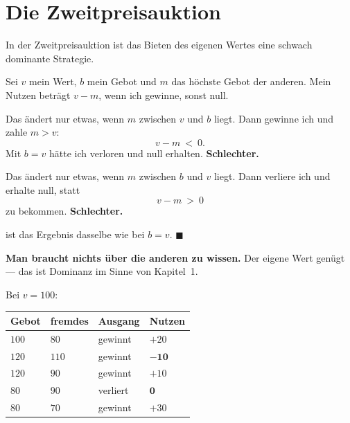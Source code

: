 \section{Die Zweitpreisauktion}

\begin{merksatz}
In der Zweitpreisauktion ist das Bieten des eigenen Wertes eine schwach dominante Strategie.

Sei $v$ mein Wert, $b$ mein Gebot und $m$ das höchste Gebot der anderen. Mein Nutzen beträgt $v-m$, wenn ich gewinne, sonst null.

 Das ändert nur etwas, wenn $m$ zwischen $v$ und $b$ liegt. Dann gewinne ich und zahle $m > v$:
\[ v - m \ <\ 0 . \]
Mit $b=v$ hätte ich verloren und null erhalten. \textbf{Schlechter.}

 Das ändert nur etwas, wenn $m$ zwischen $b$ und $v$ liegt. Dann verliere ich und erhalte null, statt
\[ v - m \ >\ 0 \]
zu bekommen. \textbf{Schlechter.}

 ist das Ergebnis dasselbe wie bei $b=v$. $\blacksquare$

\begin{center}
\begin{minipage}{0.9\textwidth}
\textbf{Man braucht nichts über die anderen zu wissen.} Der eigene Wert genügt --- das ist Dominanz im Sinne von Kapitel~1.
\end{minipage}
\end{center}

Bei $v = 100$:
\begin{center}
{\small
\renewcommand{\arraystretch}{1.48}
\begin{tabular}{@{}P{1.6cm}P{1.8cm}P{2.0cm}P{2.0cm}@{}}
\toprule
\textbf{Gebot} & \textbf{fremdes} & \textbf{Ausgang} & \textbf{Nutzen}\\
\midrule
$100$ & $80$ & gewinnt & $+20$\\
$120$ & $110$ & gewinnt & $\mathbf{-10}$\\
$120$ & $90$ & gewinnt & $+10$\\
$80$ & $90$ & \textcolor{akzent}{verliert} & $\mathbf{0}$\\
$80$ & $70$ & gewinnt & $+30$\\
\bottomrule
\end{tabular}}
\end{center}

\begin{center}
\begin{minipage}{0.88\textwidth}
\end{minipage}
\end{center}
\end{merksatz}

